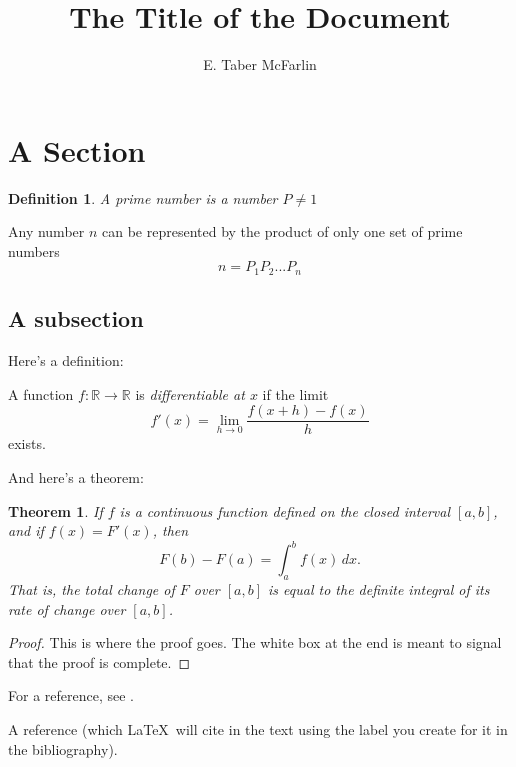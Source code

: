 \documentclass[12pt,a4paper,reqno,parskip=full]{amsart}
\numberwithin{equation}{section}
\theoremstyle{plain}
\newtheorem{theorem}[subsection]{Theorem}
\newtheorem{definition}[subsection]{Definition}
\theoremstyle{definition}
\def\R{{\mathbb R}}
\begin{document}
\title{The Title of the Document}

\author{E. Taber McFarlin}

\maketitle

\section{A Section}

\begin{definition}
A prime number is a number $P \neq 1$
\end{definition}
Any number $n$ can be represented by the product of only one set of prime numbers
\[
  n = P_1P_2...P_n
\] 

\subsection{A subsection}

Here's a definition:

A function $f:\R\to\R$ is \emph{differentiable at $x$} if the limit
\[
f'(x)=\lim_{h\to 0}\frac{f(x+h)-f(x)}{h}
\]
exists.

And here's a theorem:

\begin{theorem}
If $f$ is a continuous function defined on the closed interval $[a,b]$, and if $f(x)=F'(x)$, then
\[
F(b)-F(a)=\int_a^bf(x)\,dx.
\]
That is, the total change of $F$ over $[a,b]$ is equal to the definite integral of its rate of change over $[a,b]$.
\end{theorem}

\begin{proof}
This is where the proof goes. The white box at the end is meant to signal that the proof is complete.
\end{proof}

For a reference, see \cite{ref}.

\begin{thebibliography}{10}

 A reference (which \LaTeX\ will cite in the text using the label you create for it in the bibliography).

\end{thebibliography}
\end{document}
